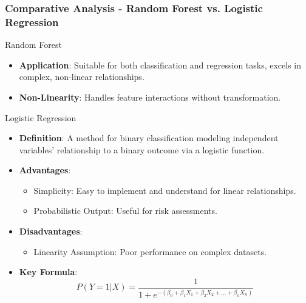 \documentclass[aspectratio=169]{beamer}
\begin{document}
\begin{frame}[fragile]
    \frametitle{Comparative Analysis - Random Forest vs. Logistic Regression}
    \begin{block}{Random Forest}
        \begin{itemize}
            \item \textbf{Application}: Suitable for both classification and regression tasks, excels in complex, non-linear relationships.
            \item \textbf{Non-Linearity}: Handles feature interactions without transformation.
        \end{itemize}
    \end{block}

    \begin{block}{Logistic Regression}
        \begin{itemize}
            \item \textbf{Definition}: A method for binary classification modeling independent variables' relationship to a binary outcome via a logistic function.
            \item \textbf{Advantages}:
                \begin{itemize}
                    \item Simplicity: Easy to implement and understand for linear relationships.
                    \item Probabilistic Output: Useful for risk assessments.
                \end{itemize}
            \item \textbf{Disadvantages}:
                \begin{itemize}
                    \item Linearity Assumption: Poor performance on complex datasets.
                \end{itemize}
            \item \textbf{Key Formula}:
                \begin{equation}
                    P(Y = 1|X) = \frac{1}{1 + e^{-(\beta_0 + \beta_1 X_1 + \beta_2 X_2 + ... + \beta_n X_n)}}
                \end{equation}
        \end{itemize}
    \end{block}
\end{frame}
\end{document}
